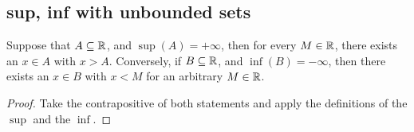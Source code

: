 \documentclass[../../main.tex]{subfiles}
\begin{document}
\subsection{sup, inf with unbounded sets}
\begin{wts}\label{lemma:sup inf with unbounded sets}
    Suppose that $A\subseteq\mathbb{R}$, and $\sup(A)=+\infty$, then for every $M\in\mathbb{R}$, there exists an $x\in A$ with $x>A$. Conversely, if $B\subseteq\mathbb{R}$, and $\inf(B)=-\infty$, then there exists an $x\in B$ with $x<M$ for an arbitrary $M\in\mathbb{R}$.
\end{wts}
\begin{proof}
    Take the contrapositive of both statements and apply the definitions of the $\sup$ and the $\inf$.
\end{proof}
\end{document}
